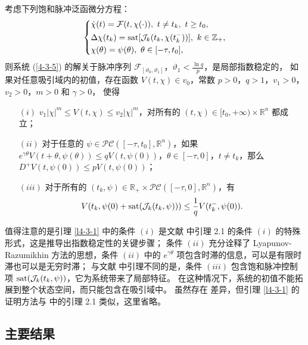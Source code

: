 \begin{lemma}\label{l4-3-1} 考虑下列饱和脉冲泛函微分方程： 
    \begin{align}\label{4-3-5}\left\{
    \begin{aligned} 
   & \dot{\chi}(t)= \mathcal{F}(t, \chi(\cdot)) ,\ t\neq t_k,\ t\geq t_0,\\ 
    &\Delta \chi(t_k)= {\rm sat}[\mathcal{J}_k(t_k, \chi(t^-_k))],\ k\in \mathbb{Z}_+,\\
    &\chi(\theta)=\psi(\theta),\ \theta\in[-\tau,t_0],
    \end{aligned}\right.
    \end{align}    
    则系统 (\ref{4-3-5}) 的解关于脉冲序列  $\mathscr{F}_{[\vartheta_0,\vartheta_1]}$，$\vartheta_1 <  \frac{\ln q}{p}$，是局部指数稳定的，
    如果对任意吸引域内的初值，存在函数 $V(t, \chi)\in v_0$，常数 $p> 0$，$q>1$，$v_1>0$，$v_2>0$，$m>0$ 和 $\gamma>0$， 使得
    \begin{itemize}
        \item[$(i)$] $v_1|\chi|^m \leq V(t, \chi) \leq v_2|\chi|^m$，对所有的 $(t, \chi)\in[t_0,+\infty)\times \mathbb{R}^n$ 都成立；
        \item[$(ii)$] 对于任意的  $\psi\in\mathcal{PC}([-\tau, t_0],\mathbb{R}^n)$，如果 $e^{\gamma \theta}V(t + \theta,\psi(\theta))\leq q V (t,\psi(0))$，$ \theta\in[-\tau, 0]$，$t \neq t_k$，那么 $D^+V(t,\psi(0))\leq p V( t,\psi(0))$；
        \item[$(iii)$] 对于所有的 $(t_k ,\psi)\in \mathbb{R}_+\times \mathcal{PC}([-\tau, 0],\mathbb{R}^n)$，有
        $$V(t_k ,\psi(0) + {\rm sat}(\mathcal{J}_k (t_k ,\psi)))\leq\frac{1}{q} V(t_k^- ,\psi(0)).$$   
    \end{itemize}
\end{lemma} 
\begin{remark}
值得注意的是引理 \ref{l4-3-1} 中的条件 $(i)$ 是文献 \cite{zhang2017sampled2199} 中引理 2.1 的条件  $(i)$ 的特殊形式，这是推导出指数稳定性的关键步骤； 条件 $(ii)$ 充分诠释了 Lyapunov-Razumikhin 方法的思想，条件 $(ii)$ 中的 $e^{\gamma\theta}$ 项包含时滞的信息，可以是有限时滞也可以是无穷时滞； 与文献 \cite{zhang2017sampled2199} 中引理不同的是，条件 $(iii)$  包含饱和脉冲控制项 ${\rm sat}(\mathcal{J}_k (t_k ,\psi))$，它为系统带来了局部特征。 在这种情况下，系统的初值不能拓展到整个状态空间，而只能包含在吸引域中。 虽然存在 差异，但引理 \ref{l4-3-1} 的证明方法与 \cite{zhang2017sampled2199} 中的引理  2.1 类似，这里省略。
\end{remark}
\subsection{主要结果}\label{cc}

